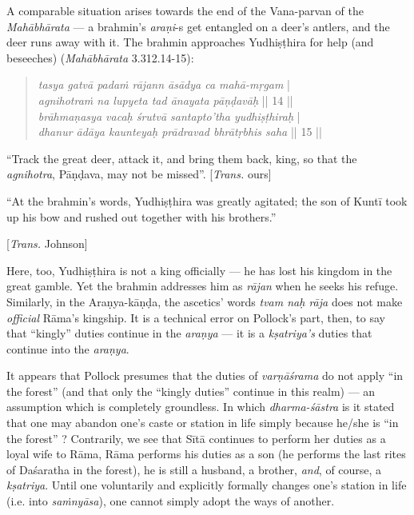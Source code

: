 A comparable situation arises towards the end of the Vana-parvan of the {\sl Mahābhārata} --- a brahmin’s {\sl araṇi}-s get entangled on a deer’s antlers, and the deer runs away with it. The brahmin approaches Yudhiṣṭhira for help (and beseeches) ({\sl Mahābhārata} 3.312.14-15): 

\newpage

\begin{quote}
{{\sl tasya gatvā padaṁ rājann āsādya ca mahā-mṛgam}} |\\
{\sl agnihotraṁ na lupyeta tad ānayata pāṇḍavāḥ} || 14 ||\\
{\sl brāhmaṇasya vacaḥ śrutvā santapto’tha yudhiṣṭhiraḥ} |\\
{\sl dhanur ādāya kaunteyaḥ prādravad bhrātṛbhis saha} || 15 ||
\end{quote}


\begin{myquote}
“Track the great deer, attack it, and bring them back, king, so that the {\sl agnihotra}, Pāṇḍava, may not be missed”. [{\sl Trans.} ours]

“At the brahmin’s words, Yudhiṣṭhira was greatly agitated; the son of Kuntī took up his bow and rushed out together with his brothers.”

\hfill [{\sl Trans.} Johnson]
\end{myquote}

Here, too, Yudhiṣṭhira is not a king officially --- he has lost his kingdom in the great gamble. Yet the brahmin addresses him as {\sl rājan} when he seeks his refuge. Similarly, in the Araṇya-kāṇḍa, the ascetics’ words {\sl tvam naḥ rāja} does not make {\sl official} Rāma’s kingship. It is a technical error on Pollock’s part, then, to say that “kingly” duties continue in the {\sl araṇya} --- it is a {\sl kṣatriya’s} duties that continue into the {\sl araṇya}.

It appears that Pollock presumes that the duties of {\sl varṇāśrama} do not apply “in the forest” (and that only the “kingly duties” continue in this realm) --- an assumption which is completely groundless. In which {\sl dharma-śāstra} is it stated that one may abandon one’s caste or station in life simply because he/she is “in the forest” ? Contrarily, we see that Sītā continues to perform her duties as a loyal wife to Rāma, Rāma performs his duties as a son (he performs the last rites of Daśaratha in the forest), he is still a husband, a brother, {\sl and}, of course, a {\sl kṣatriya}. Until one voluntarily and explicitly formally changes one’s station in life (i.e. into {\sl saṁnyāsa}), one cannot simply adopt the ways of another. 

